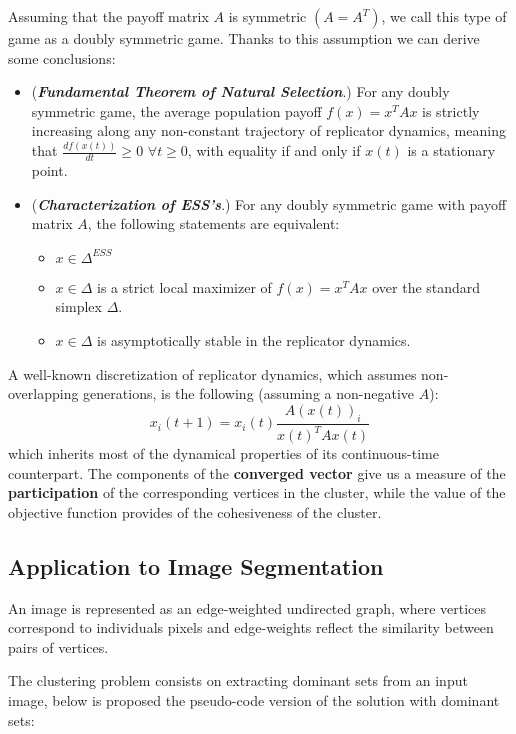 Assuming that the payoff matrix $A$ is symmetric $(A = A^T)$, we call this type of game as a doubly symmetric game. Thanks to this assumption we can derive some conclusions:
\begin{itemize}
	\item (\textbf{\textit{Fundamental Theorem of Natural Selection}}.) For any doubly symmetric game, the average population payoff $f(x) = x^TAx$ is strictly increasing along any non-constant trajectory of replicator dynamics, meaning that $\frac{df(x(t))}{dt} \geq 0$ $\forall t \geq0$, with equality if and only if $x(t)$ is a stationary point.
	\item (\textit{\textbf{Characterization of ESS's}}.) For any doubly symmetric game with payoff matrix $A$, the following statements are equivalent:
	\begin{itemize}
		\item $x\in \Delta^{ESS}$
		\item $x \in \Delta$ is a strict local maximizer of $f(x) = x^TAx$ over the standard simplex $\Delta$.
		\item $x\in\Delta$ is asymptotically stable in the replicator dynamics.
	\end{itemize}
\end{itemize}


A well-known discretization of replicator dynamics, which assumes non-overlapping generations, is the following (assuming a non-negative $A$): 
$$
x_i(t+1) = x_i(t)\frac{A(x(t))_i}{x(t)^TAx(t)}
$$
which inherits most of the dynamical properties of its continuous-time counterpart.
The components of the \textbf{converged vector} give us a measure of the \textbf{participation} of the corresponding vertices in the cluster, while the value of the objective function provides of the cohesiveness of the cluster.

\subsection{Application to Image Segmentation}
An image is represented as an edge-weighted undirected graph, where vertices correspond to individuals pixels and edge-weights reflect the similarity between pairs of vertices.

The clustering problem consists on extracting dominant sets from an input image, below is proposed the pseudo-code version of the solution with dominant sets:

